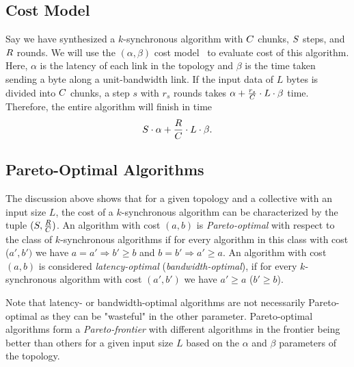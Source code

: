 \subsection{Cost Model}
\label{sec:costmodel}
Say we have synthesized a $k$-synchronous algorithm with $C$
chunks, $S$ steps, and $R$ rounds. We will use the
$(\alpha, \beta)$ cost model~\cite{hockney1994communication} to
evaluate cost of this algorithm. Here, $\alpha$ is the latency of each
link in the topology and $\beta$ is the time taken sending a byte
along a unit-bandwidth link. If the input data of $L$ bytes is divided
into $C$ chunks, a step $s$ with $r_s$ rounds takes $\alpha +
\frac{r_s}{C}\cdot L \cdot \beta$ time. Therefore, the entire
algorithm will finish in time
$$ S \cdot \alpha + \frac{R}{C} \cdot L \cdot \beta. $$

\subsection{Pareto-Optimal Algorithms}
\label{sec:pareto:optimal}
The discussion above shows that for a given topology and a collective
with an input size $L$, the cost of a $k$-synchronous algorithm can be
characterized by the tuple $(S, \frac{R}{C})$. An
algorithm with cost $(a,b)$ is {\em Pareto-optimal} with respect to
the class of $k$-synchronous algorithms if for every algorithm in this
class with cost  ($a', b')$ we have $a = a' \Rightarrow b' \geq b$ and
$b = b' \Rightarrow a' \geq a$. An algorithm with cost $(a,b)$ is
considered {\em latency-optimal} ({\em bandwidth-optimal}), if for
every $k$-synchronous algorithm with cost $(a',b')$ we have $a' \geq
a$ ($b' \geq b$).

Note that latency- or bandwidth-optimal algorithms are not necessarily
Pareto-optimal as they can be "wasteful" in the other parameter.
Pareto-optimal algorithms form a {\em Pareto-frontier} with different
algorithms in the frontier being better than others for a given input
size $L$ based on the $\alpha$ and $\beta$ parameters of the topology.


